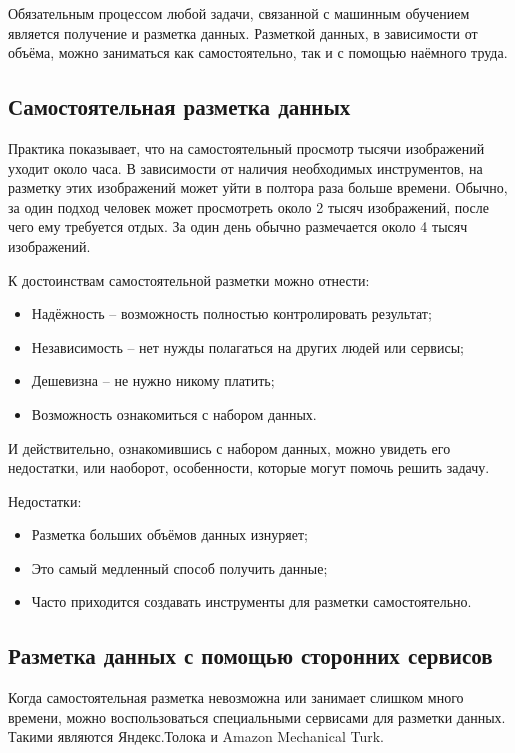 Обязательным процессом любой задачи, связанной с машинным обучением является получение и разметка данных. Разметкой данных, в зависимости от объёма, можно заниматься как самостоятельно, так и с помощью наёмного труда. 

\subsection{Самостоятельная разметка данных} \label{self_labeling}
Практика показывает, что на самостоятельный просмотр тысячи изображений уходит около часа. В зависимости от наличия необходимых инструментов, на разметку этих изображений может уйти в полтора раза больше времени. Обычно, за один подход человек может просмотреть около 2 тысяч изображений, после чего ему требуется отдых. За один день обычно размечается около 4 тысяч изображений.

К достоинствам самостоятельной разметки можно отнести:
\begin{itemize}[wide]
    \item Надёжность -- возможность полностью контролировать результат;
    \item Независимость -- нет нужды полагаться на других людей или сервисы;
    \item Дешевизна -- не нужно никому платить;
    \item Возможность ознакомиться с набором данных.
\end{itemize}
И действительно, ознакомившись с набором данных, можно увидеть его недостатки, или наоборот, особенности, которые могут помочь решить задачу.

Недостатки:
\begin{itemize}[wide]
    \item Разметка больших объёмов данных изнуряет;
    \item Это самый медленный способ получить данные;
    \item Часто приходится создавать инструменты для разметки самостоятельно.
\end{itemize}


\subsection{Разметка данных с помощью сторонних сервисов} \label{toloka}
Когда самостоятельная разметка невозможна или занимает слишком много времени, можно воспользоваться специальными сервисами для разметки данных. Такими являются Яндекс.Толока и Amazon Mechanical Turk.

